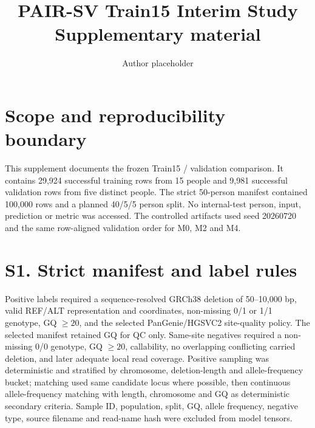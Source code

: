 \documentclass[10pt]{article}
\title{PAIR-SV Train15 Interim Study\\Supplementary material}
\author{Author placeholder}
\date{}
\begin{document}
\maketitle

\section*{Scope and reproducibility boundary}
This supplement documents the frozen Train15 / validation comparison. It contains 29,924 successful training rows from 15 people and 9,981 successful validation rows from five distinct people. The strict 50-person manifest contained 100,000 rows and a planned 40/5/5 person split. No internal-test person, input, prediction or metric was accessed. The controlled artifacts used seed 20260720 and the same row-aligned validation order for M0, M2 and M4.

\section*{S1. Strict manifest and label rules}
Positive labels required a sequence-resolved GRCh38 deletion of 50--10,000 bp, valid REF/ALT representation and coordinates, non-missing 0/1 or 1/1 genotype, GQ $\geq20$, and the selected PanGenie/HGSVC2 site-quality policy. The selected manifest retained GQ for QC only. Same-site negatives required a non-missing 0/0 genotype, GQ $\geq20$, callability, no overlapping conflicting carried deletion, and later adequate local read coverage. Positive sampling was deterministic and stratified by chromosome, deletion-length and allele-frequency bucket; matching used same candidate locus where possible, then continuous allele-frequency matching with length, chromosome and GQ as deterministic secondary criteria. Sample ID, population, split, GQ, allele frequency, negative type, source filename and read-name hash were excluded from model tensors.
\end{document}
